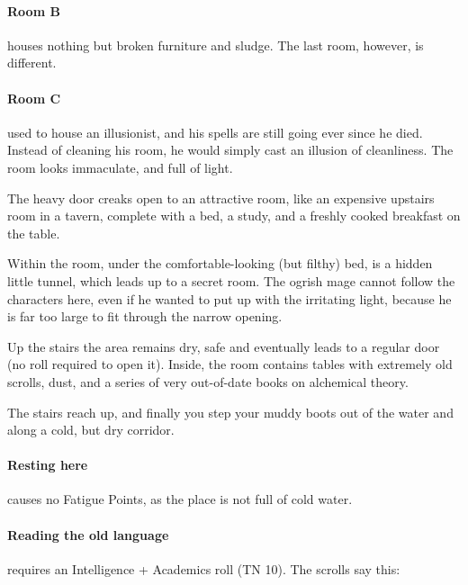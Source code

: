 \begin{multicols}{2}
\paragraph{Room B} houses nothing but broken furniture and sludge.
The last room, however, is different.

\paragraph{Room C} used to house an illusionist, and his spells are still going ever since he died.
Instead of cleaning his room, he would simply cast an illusion of cleanliness.
The room looks immaculate, and full of light.

\begin{boxtext}
  The heavy door creaks open to an attractive room, like an expensive upstairs room in a tavern, complete with a bed, a study, and a freshly cooked breakfast on the table.
\end{boxtext}

Within the room, under the comfortable-looking (but filthy) bed, is a hidden little tunnel, which leads up to a secret room.
The ogrish mage cannot follow the characters here, even if he wanted to put up with the irritating light, because he is far too large to fit through the narrow opening.


Up the stairs the area remains dry, safe and eventually leads to a regular door (no roll required to open it).
Inside, the room contains tables with extremely old scrolls, dust, and a series of very out-of-date books on alchemical theory.

\begin{boxtext}

  The stairs reach up, and finally you step your muddy boots out of the water and along a cold, but dry corridor.

\end{boxtext}

\paragraph{Resting here}
causes no Fatigue Points, as the place is not full of cold water.

\paragraph{Reading the old language}
requires an Intelligence + Academics roll (TN 10).
The scrolls say this:


\end{multicols}
